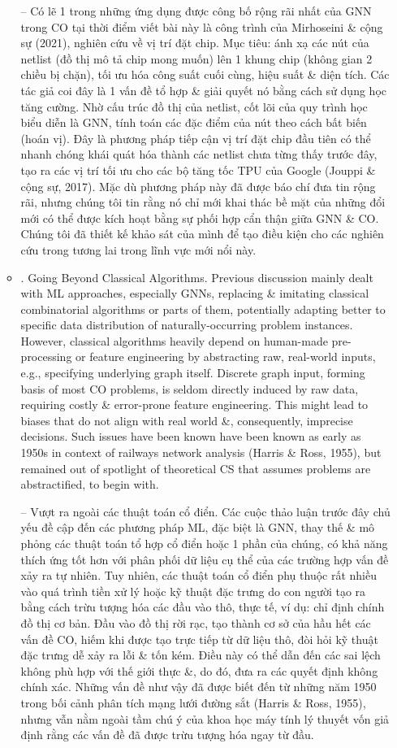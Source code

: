 \documentclass{article}
\begin{document}
\begin{itemize}
\begin{itemize}
        -- Có lẽ 1 trong những ứng dụng được công bố rộng rãi nhất của GNN trong CO tại thời điểm viết bài này là công trình của Mirhoseini \& cộng sự (2021), nghiên cứu về vị trí đặt chip. Mục tiêu: ánh xạ các nút của netlist (đồ thị mô tả chip mong muốn) lên 1 khung chip (không gian 2 chiều bị chặn), tối ưu hóa công suất cuối cùng, hiệu suất \& diện tích. Các tác giả coi đây là 1 vấn đề tổ hợp \& giải quyết nó bằng cách sử dụng học tăng cường. Nhờ cấu trúc đồ thị của netlist, cốt lõi của quy trình học biểu diễn là GNN, tính toán các đặc điểm của nút theo cách bất biến (hoán vị). Đây là phương pháp tiếp cận vị trí đặt chip đầu tiên có thể nhanh chóng khái quát hóa thành các netlist chưa từng thấy trước đây, tạo ra các vị trí tối ưu cho các bộ tăng tốc TPU của Google (Jouppi \& cộng sự, 2017). Mặc dù phương pháp này đã được báo chí đưa tin rộng rãi, nhưng chúng tôi tin rằng nó chỉ mới khai thác bề mặt của những đổi mới có thể được kích hoạt bằng sự phối hợp cẩn thận giữa GNN \& CO. Chúng tôi đã thiết kế khảo sát của mình để tạo điều kiện cho các nghiên cứu trong tương lai trong lĩnh vực mới nổi này.
        \item {. Going Beyond Classical Algorithms.} Previous discussion mainly dealt with ML approaches, especially GNNs, replacing \& imitating classical combinatorial algorithms or parts of them, potentially adapting better to specific data distribution of naturally-occurring problem instances. However, classical algorithms heavily depend on human-made pre-processing or feature engineering by abstracting raw, real-world inputs, e.g., specifying underlying graph itself. Discrete graph input, forming basis of most CO problems, is seldom directly induced by raw data, requiring costly \& error-prone feature engineering. This might lead to biases that do not align with real world \&, consequently, imprecise decisions. Such issues have been known have been known as early as 1950s in context of railways network analysis (Harris \& Ross, 1955), but remained out of spotlight of theoretical CS that assumes problems are abstractified, to begin with.

        -- {\sf Vượt ra ngoài các thuật toán cổ điển.} Các cuộc thảo luận trước đây chủ yếu đề cập đến các phương pháp ML, đặc biệt là GNN, thay thế \& mô phỏng các thuật toán tổ hợp cổ điển hoặc 1 phần của chúng, có khả năng thích ứng tốt hơn với phân phối dữ liệu cụ thể của các trường hợp vấn đề xảy ra tự nhiên. Tuy nhiên, các thuật toán cổ điển phụ thuộc rất nhiều vào quá trình tiền xử lý hoặc kỹ thuật đặc trưng do con người tạo ra bằng cách trừu tượng hóa các đầu vào thô, thực tế, ví dụ: chỉ định chính đồ thị cơ bản. Đầu vào đồ thị rời rạc, tạo thành cơ sở của hầu hết các vấn đề CO, hiếm khi được tạo trực tiếp từ dữ liệu thô, đòi hỏi kỹ thuật đặc trưng dễ xảy ra lỗi \& tốn kém. Điều này có thể dẫn đến các sai lệch không phù hợp với thế giới thực \&, do đó, đưa ra các quyết định không chính xác. Những vấn đề như vậy đã được biết đến từ những năm 1950 trong bối cảnh phân tích mạng lưới đường sắt (Harris \& Ross, 1955), nhưng vẫn nằm ngoài tầm chú ý của khoa học máy tính lý thuyết vốn giả định rằng các vấn đề đã được trừu tượng hóa ngay từ đầu.


\end{itemize}
\end{itemize}
\end{document}
